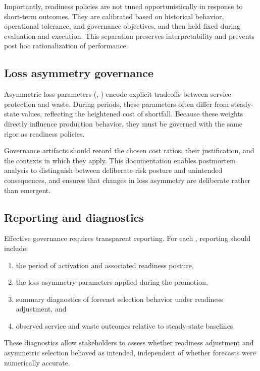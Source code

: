 Importantly, readiness policies are not tuned opportunistically in response to short-term outcomes.
They are calibrated based on historical behavior, operational tolerance, and governance objectives,
and then held fixed during evaluation and execution. This separation preserves interpretability and
prevents post hoc rationalization of performance.

\subsection{Loss asymmetry governance}
\label{subsec:loss-governance}

Asymmetric loss parameters (\cu{}, \co{}) encode explicit tradeoffs between service protection and
waste. During \LTO{} periods, these parameters often differ from steady-state values, reflecting the
heightened cost of shortfall. Because these weights directly influence production behavior, they must
be governed with the same rigor as readiness policies.

Governance artifacts should record the chosen cost ratios, their justification, and the contexts in
which they apply. This documentation enables postmortem analysis to distinguish between deliberate
risk posture and unintended consequences, and ensures that changes in loss asymmetry are deliberate
rather than emergent.

\subsection{Reporting and diagnostics}
\label{subsec:reporting-diagnostics}

Effective governance requires transparent reporting. For each \LTO{}, reporting should include:
\begin{enumerate}[leftmargin=*, itemsep=2pt]
  \item the period of \LTO{} activation and associated readiness posture,
  \item the loss asymmetry parameters applied during the promotion,
  \item summary diagnostics of forecast selection behavior under readiness adjustment, and
  \item observed service and waste outcomes relative to steady-state baselines.
\end{enumerate}

These diagnostics allow stakeholders to assess whether readiness adjustment and asymmetric
selection behaved as intended, independent of whether forecasts were numerically accurate.

